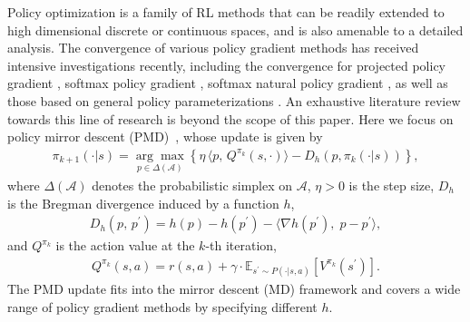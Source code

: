 \documentclass[10pt]{article}
\newcommand{\calA}{\mathcal{A}}
\newcommand{\E}{\mathbb{E}}
\newcommand{\ls}{\left}
\newcommand{\rs}{\right}
\theoremstyle{plain}
\theoremstyle{definition}
\begin{document}
Policy optimization is a family of RL methods that can be readily extended to high dimensional discrete or continuous  spaces, and is also  amenable  to a detailed analysis. The convergence  of various policy gradient methods \cite{sutton1999policy} has received intensive investigations recently, including the convergence for projected policy gradient \cite{Agarwal_Kakade_Lee_Mahajan_2019,Xiao_2022,Zhang_Koppel_Bedi_Szepesvari_Wang_2020}, softmax policy gradient \cite{mei2021normalized,Mei_Xiao_Szepesvari_Schuurmans_2020,Agarwal_Kakade_Lee_Mahajan_2019,li2023exponential,klein2024structure,pg-liu}, softmax natural policy gradient \cite{Agarwal_Kakade_Lee_Mahajan_2019,Khodadadian_Jhunjhunwala_Varma_Maguluri_2021,pg-liu}, as well as those based on general policy parameterizations \cite{zhang2019convergence,zhang2020global,yuan2022general,fatkhullin2023stochastic,mondal2024improved,wang2019neural}.  An exhaustive literature review towards this line of research is beyond the scope of this paper. Here we focus on policy mirror descent (PMD)~\cite{shani2020trpo,vaswani2021functional},
whose update is given by
\begin{align}
    \pi_{k+1}(\cdot|s) =\underset{p\in\Delta(\calA)}{\arg\max} \ls\{ \eta\, \langle p, \,Q^{\pi_k}(s,\cdot) \rangle - D_h(p, \pi_k(\cdot|s)) \rs\},
    \label{eq:intro-PMD-policy-update-form}
\end{align}
where $\Delta(\calA)$ denotes the probabilistic simplex on $\calA$, $\eta > 0$ is the step size, $D_h$ is the Bregman divergence induced by a function $h$,
\begin{align*}
    D_h(p, \,p^\prime) = h(p) - h(p^\prime) - \langle \nabla h(p^\prime), \; p-p^\prime \rangle,
\end{align*}
and $Q^{\pi_k}$ is the action value  at the $k$-th iteration,
\begin{align*}
    Q^{\pi_k}(s,a) = r(s,a) + \gamma \cdot \E_{s^\prime \sim P(\cdot|s,a)}[V^{\pi_k}(s^\prime)].
\end{align*}
{The PMD update fits into the mirror descent (MD) framework \cite{Xiao_2022}} and covers a wide range of policy gradient methods by specifying different $h$. %
\end{document}
